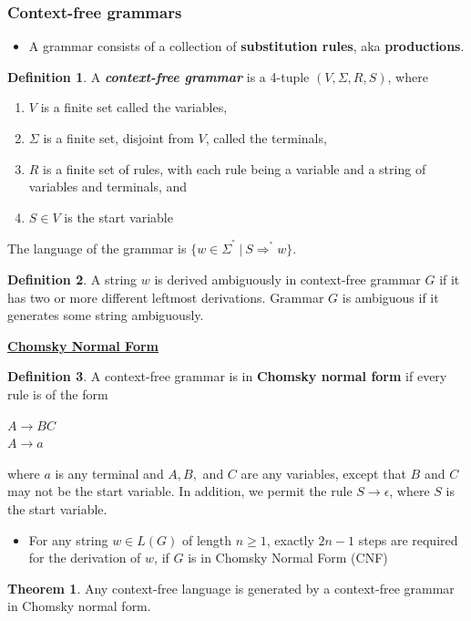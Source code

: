 \documentclass[11pt]{article}
\theoremstyle{definition}
\newtheorem{defn}{Definition}[section]
\newtheorem{thm}{Theorem}[section]
\begin{document}
\subsubsection{Context-free grammars}
\begin{itemize}[leftmargin=*]
    \item A grammar consists of a collection of \textbf{substitution rules}, aka \textbf{productions}.
\end{itemize}
\begin{defn}
A \textbf{\textit{context-free grammar}} is a 4-tuple $(V,\Sigma,R,S)$, where
\begin{enumerate}
    \item $V$ is a finite set called the variables,
    \item $\Sigma$ is a finite set, disjoint from $V$, called the terminals,
    \item $R$ is a finite set of rules, with each rule being a variable and a string of variables and terminals, and
    \item $S\in V$ is the start variable
\end{enumerate}
The language of the grammar is $\{w \in \Sigma^{^{*}}\ |\ S \Rightarrow^{^{*}} w\}$.
\end{defn}
\begin{defn}
A string $w$ is derived ambiguously in context-free grammar $G$ if it has two or more different leftmost derivations. Grammar $G$ is ambiguous if it generates some string ambiguously.
\end{defn}
\textbf{\underline{Chomsky Normal Form}}
\begin{defn}
A context-free grammar is in \textbf{Chomsky normal form} if every rule is
of the form
    \begin{center}
        $A \to BC$\\
        $A \to a$
    \end{center}
where $a$ is any terminal and $A, B,$ and $C$ are any variables, except that $B$ and $C$ may not be the start variable. In addition, we permit the rule $S\to \epsilon$, where $S$ is the start variable.
\end{defn}
\begin{itemize}[leftmargin=*]
    \item For any string $w\in L(G)$ of length $n\geq 1$, exactly $2n-1$ steps are required for the derivation of $w$, if $G$ is in Chomsky Normal Form (CNF)
\end{itemize}
\begin{thm}
    Any context-free language is generated by a context-free grammar in Chomsky
normal form.
\end{thm}
\end{document}
